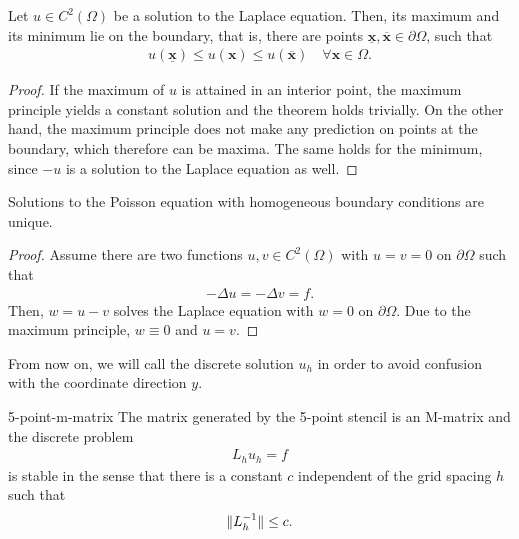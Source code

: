 \begin{corollary}
  Let $u \in C^2(\Omega)$ be a solution to the Laplace equation. Then,
  its maximum and its minimum lie on the boundary, that is, there are
  points
  $\underline{\mathbf x}, \overline{\mathbf x} \in\partial\Omega$,
  such that
  \begin{gather*}
    u(\underline{\mathbf x}) \le u(\mathbf x)
    \le u(\overline{\mathbf x})
    \quad\forall \mathbf x\in\Omega.
  \end{gather*}
\end{corollary}

\begin{proof}
  If the maximum of $u$ is attained in an interior point, the maximum
  principle yields a constant solution and the theorem holds
  trivially. On the other hand, the maximum principle does not make
  any prediction on points at the boundary, which therefore can be
  maxima. The same holds for the minimum, since $-u$ is a solution to
  the Laplace equation as well.
\end{proof}

\begin{corollary}
  Solutions to the Poisson equation with homogeneous boundary
  conditions are unique.
\end{corollary}

\begin{proof}
  Assume there are two functions $u,v\in C^2(\Omega)$ with $u=v=0$ on
  $\partial\Omega$ such that
  \begin{gather*}
    -\Delta u = -\Delta v = f.
  \end{gather*}
  Then, $w=u-v$ solves the Laplace equation with $w=0$ on
  $\partial\Omega$. Due to the maximum principle, $w \equiv 0$ and
  $u=v$.
\end{proof}





\begin{remark}
  From now on, we will call the discrete solution $u_h$ in order to
  avoid confusion with the coordinate direction $y$.
\end{remark}



\begin{Theorem}{5-point-m-matrix}
  The matrix generated by the 5-point stencil is an M-matrix and the
  discrete problem
  \begin{gather*}
    L_h u_h = f
  \end{gather*}
  is stable in the sense that there is a constant $c$ independent of
  the grid spacing $h$ such that
  \begin{gather*}
    \lVert L_h^{-1}\rVert \le c.
  \end{gather*}
\end{Theorem}

